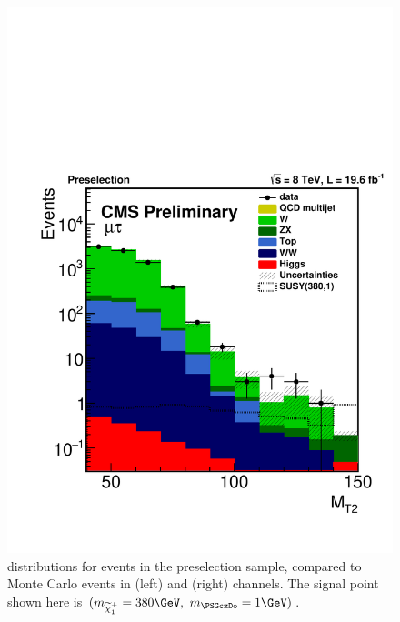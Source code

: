 \begin{figure}[!htb]
\includegraphics[angle=0,scale=0.375]{SelectionMuTau/MT2_Ratio_Preselection_unBlinded.pdf}
\caption{\mttwo  distributions for events in the preselection sample, compared to Monte Carlo events in (left) \eTau and (right) \muTau channels. The signal point shown here is $(m_{\chione}=380\GeV,~m_{\PSGczDo}=1\GeV)$.}
\label{fig:mt2leptontau}
\end{figure}

